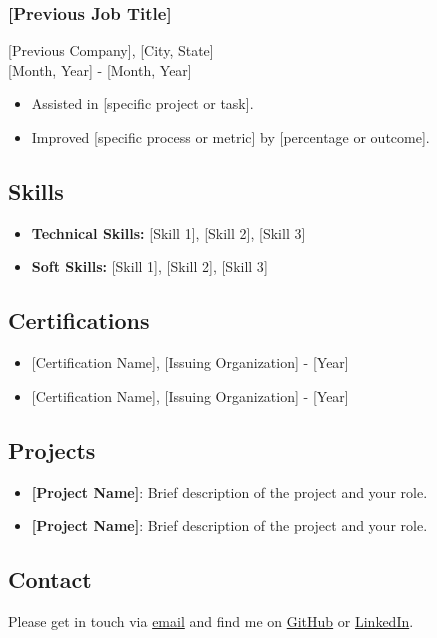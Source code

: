 \documentclass[11pt,a4paper]{article}
\providecommand{\tightlist}{%
  \setlength{\itemsep}{0pt}\setlength{\parskip}{0pt}}
\begin{document}
\subsubsection{{[}Previous Job Title{]}}\label{previous-job-title}

{[}Previous Company{]}, {[}City, State{]}\\
{[}Month, Year{]} - {[}Month, Year{]}

\begin{itemize}
\tightlist
\item
  Assisted in {[}specific project or task{]}.
\item
  Improved {[}specific process or metric{]} by {[}percentage or
  outcome{]}.
\end{itemize}

\subsection{Skills}\label{skills}

\begin{itemize}
\tightlist
\item
  \textbf{Technical Skills:} {[}Skill 1{]}, {[}Skill 2{]}, {[}Skill 3{]}
\item
  \textbf{Soft Skills:} {[}Skill 1{]}, {[}Skill 2{]}, {[}Skill 3{]}
\end{itemize}

\subsection{Certifications}\label{certifications}

\begin{itemize}
\tightlist
\item
  {[}Certification Name{]}, {[}Issuing Organization{]} - {[}Year{]}
\item
  {[}Certification Name{]}, {[}Issuing Organization{]} - {[}Year{]}
\end{itemize}

\subsection{Projects}\label{projects}

\begin{itemize}
\tightlist
\item
  \textbf{{[}Project Name{]}}: Brief description of the project and your
  role.
\item
  \textbf{{[}Project Name{]}}: Brief description of the project and your
  role.
\end{itemize}

\subsection{Contact}\label{contact}

Please get in touch via \href{mailto:example@gmail.com}{email} and find
me on \href{https://github.com/}{GitHub} or
\href{https://www.linkedin.com/in/}{LinkedIn}.
\end{document}
